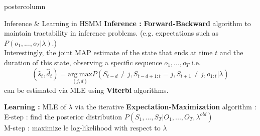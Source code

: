 \documentclass[final,hyperref={pdfpagelabels=false}]{beamer}
\newlength{\columnheight}
\begin{document}
\begin{frame}
\begin{columns}
    \begin{column}{.50\textwidth}
      \begin{beamercolorbox}[center,wd=\textwidth]{postercolumn}
        \begin{minipage}[T]{.98\textwidth} %
          \parbox[t][\columnheight]{\textwidth}{ %
            \begin{block}{Inference \& Learning in HSMM}
                \textbf{Inference :}
                \textbf{Forward-Backward} algorithm to maintain tractability in inference problems.
                (e.g. expectations such as $P(o_1, ..., o_T | \lambda)$.)\\
                Interestingly, the joint MAP estimate of the state that ends at time $t$ and the duration of this state,
                observing a specific sequence $o_1, ..., o_T$ i.e.
                { $$(\hat s_t, \hat d_t) = \underset{(j,d)}{\mathrm{arg~max}} P(S_{t-d} \neq j, S_{t-d+1:t} = j, S_{t+1} \neq j, o_{1:t} | \lambda)$$}
                can be estimated via MLE using \textbf{Viterbi} algorithms.

                \vskip1cm
                \textbf{Learning :}
                MLE of $\lambda$ via the iterative \textbf{Expectation-Maximization} algorithm :\\
                E-step : find the posterior distribution {\small $P(S_1, ..., S_T | O_1, ..., O_T, \lambda^{old})$}\\
                M-step : maximize le log-likelihood with respect to $\lambda$
            \end{block}

}
\end{minipage}
\end{beamercolorbox}
\end{column}
\end{columns}
\end{frame}
\end{document}
